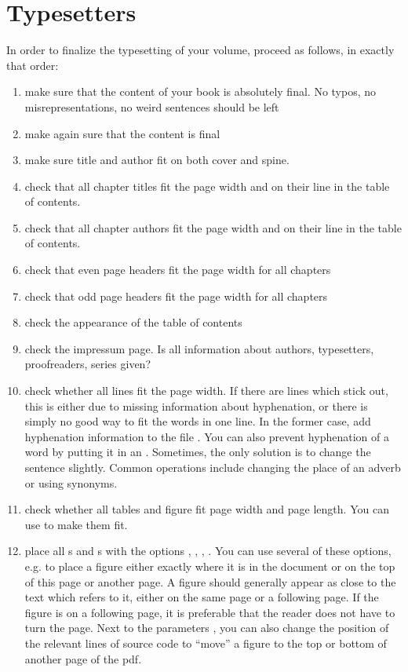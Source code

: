 \chapter{Typesetters}
In order to finalize the typesetting of your volume, proceed as follows, in exactly that order:

\begin{enumerate}
 \item make sure that the content of your book is absolutely final. No typos, no misrepresentations, no weird sentences should be left
 \item make again sure that the content is final 
 \item make sure title and author fit on both cover and spine. 
 \item check that all chapter titles fit the page width and on their line in the table of contents. 
 \item check that all chapter authors fit the page width and on their line in the table of contents. 
 \item check that even page headers fit the page width for all chapters
 \item check that odd page headers fit the page width for all chapters
 \item check the appearance of the table of contents
 \item check the impressum page. Is all information about authors, typesetters, proofreaders, series given?
 \item check whether all lines fit the page width. If there are lines which stick out, this is either due to missing information about hyphenation, or there is simply no good way to fit the words in one line. In the former case, add hyphenation information to the file . You can also prevent hyphenation of a word by putting it in an . Sometimes, the only solution is to change the sentence slightly. Common operations include changing the place of an adverb or using synonyms.
 \item check whether all tables and figure fit page width and page length. You can use  to make them fit.
 \item place all s and s with the options 
, 
, 
,
. You can use several of these options, e.g.  to place a figure either exactly where it is in the document or on the top of this page or another page.  A figure should generally appear as close to the text which refers to it, either on the same page or a following page. If the figure is on a following page, it is preferable that the reader does not have to turn the page. Next to the parameters \computer{[hbpt]}, you can also change the position of the relevant lines of source code to ``move'' a figure to the top or bottom of another page of the pdf. 

\end{enumerate}
